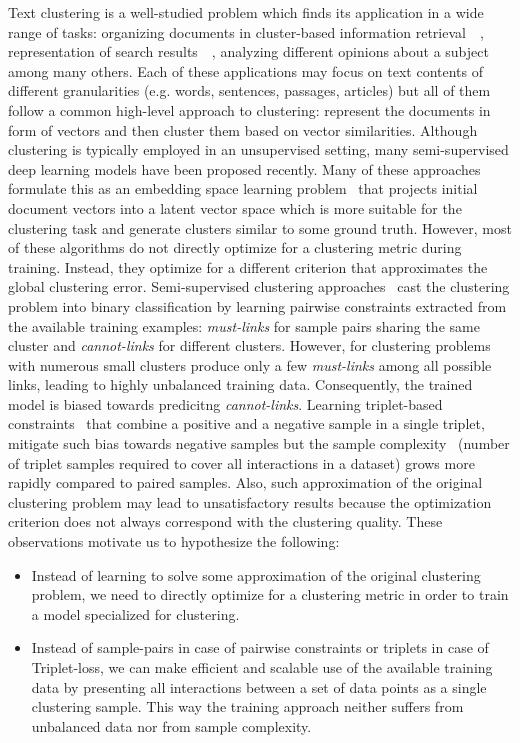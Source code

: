 \documentclass[11pt,a4paper]{article}
\begin{document}
Text clustering is a well-studied problem which finds its application in a wide range of tasks: organizing documents in cluster-based information retrieval~\cite{cutting2017scatter}~\cite{mei2014proximity}, representation of search results~\cite{37745}~\cite{navigli2010inducing}, analyzing different opinions about a subject~\cite{tsirakis2017large} among many others. Each of these applications may focus on text contents of different granularities (e.g. words, sentences, passages, articles) but all of them follow a common high-level approach to clustering: represent the documents in form of vectors and then cluster them based on vector similarities. Although clustering is typically employed in an unsupervised setting, many semi-supervised deep learning models have been proposed recently. Many of these approaches formulate this as an embedding space learning problem~\cite{yang2017towards} that projects initial document vectors into a latent vector space which is more suitable for the clustering task and generate clusters similar to some ground truth. However, most of these algorithms do not directly optimize for a clustering metric during training. Instead, they optimize for a different criterion that approximates the global clustering error. Semi-supervised clustering approaches~\cite{basu2002semi} cast the clustering problem into binary classification by learning pairwise constraints extracted from the available training examples: \textit{must-links} for sample pairs sharing the same cluster and \textit{cannot-links} for different clusters. However, for clustering problems with numerous small clusters produce only a few \textit{must-links} among all possible links, leading to highly unbalanced training data. Consequently, the trained model is biased towards predicitng \textit{cannot-links}. Learning triplet-based constraints~\cite{dor2018learning} that combine a positive and a negative sample in a single triplet, mitigate such bias towards negative samples but the sample complexity~\cite{bartlett1998sample} (number of triplet samples required to cover all interactions in a dataset) grows more rapidly compared to paired samples. Also, such approximation of the original clustering problem may lead to unsatisfactory results because the optimization criterion does not always correspond with the clustering quality. These observations motivate us to hypothesize the following:

\begin{itemize}
    \item Instead of learning to solve some approximation of the original clustering problem, we need to directly optimize for a clustering metric in order to train a model specialized for clustering.
    \item Instead of sample-pairs in case of pairwise constraints or triplets in case of Triplet-loss, we can make efficient and scalable use of the available training data by presenting all interactions between a set of data points as a single clustering sample. This way the training approach neither suffers from unbalanced data nor from sample complexity.
\end{itemize}
\end{document}
